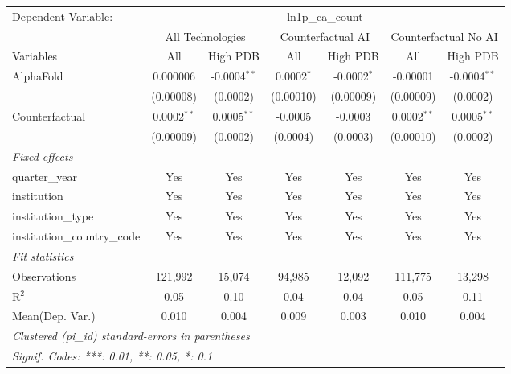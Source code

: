 \begingroup
\centering
\begin{tabular}{lcccccc}
   \tabularnewline \midrule \midrule
   Dependent Variable: & \multicolumn{6}{c}{ln1p\_ca\_count}\\
 & \multicolumn{2}{c}{All Technologies} & \multicolumn{2}{c}{Counterfactual AI} & \multicolumn{2}{c}{Counterfactual No AI} \\
\cmidrule(lr){1-1}\cmidrule(lr){2-3} \cmidrule(lr){4-5} \cmidrule(lr){6-7}
Variables & \multicolumn{1}{c}{All} & \multicolumn{1}{c}{High PDB} & \multicolumn{1}{c}{All} & \multicolumn{1}{c}{High PDB} & \multicolumn{1}{c}{All} & \multicolumn{1}{c}{High PDB} \\
\cmidrule(lr){1-1}\cmidrule(lr){2-2} \cmidrule(lr){3-3} \cmidrule(lr){4-4} \cmidrule(lr){5-5} \cmidrule(lr){6-6} \cmidrule(lr){7-7}
   AlphaFold                    & 0.000006      & -0.0004$^{**}$ & 0.0002$^{*}$ & -0.0002$^{*}$ & -0.00001      & -0.0004$^{**}$\\   
                                & (0.00008)     & (0.0002)       & (0.00010)    & (0.00009)     & (0.00009)     & (0.0002)\\   
   Counterfactual               & 0.0002$^{**}$ & 0.0005$^{**}$  & -0.0005      & -0.0003       & 0.0002$^{**}$ & 0.0005$^{**}$\\   
                                & (0.00009)     & (0.0002)       & (0.0004)     & (0.0003)      & (0.00010)     & (0.0002)\\   
   \midrule
   \emph{Fixed-effects}\\
   quarter\_year                & Yes           & Yes            & Yes          & Yes           & Yes           & Yes\\  
   institution                  & Yes           & Yes            & Yes          & Yes           & Yes           & Yes\\  
   institution\_type            & Yes           & Yes            & Yes          & Yes           & Yes           & Yes\\  
   institution\_country\_code   & Yes           & Yes            & Yes          & Yes           & Yes           & Yes\\  
   \midrule
   \emph{Fit statistics}\\
   Observations                 & 121,992       & 15,074         & 94,985       & 12,092        & 111,775       & 13,298\\  
   R$^2$                        & 0.05          & 0.10           & 0.04         & 0.04          & 0.05          & 0.11\\  
Mean(Dep. Var.) & 0.010 & 0.004 & 0.009 & 0.003 & 0.010 & 0.004 \\
   \midrule \midrule
   \multicolumn{7}{l}{\emph{Clustered (pi\_id) standard-errors in parentheses}}\\
   \multicolumn{7}{l}{\emph{Signif. Codes: ***: 0.01, **: 0.05, *: 0.1}}\\
\end{tabular}
\par\endgroup
